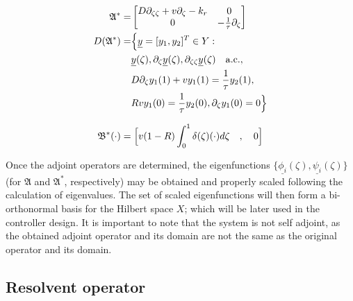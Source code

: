 \begin{equation} \label{eq:adjoint_A}
    \begin{aligned}
        {\mathfrak{A}}^{*} =&
        \begin{bmatrix}
            D \partial_{\zeta \zeta} + v \partial_\zeta - k_r & 0\\
            0 & -\frac{1}{\tau} \partial_\zeta
        \end{bmatrix}\\
        D(\mathfrak{A}^*) =& \Bigl\{ \underline{y} = [y_1, y_2]^T \in Y:\\
        &\underline{y}(\zeta), \partial_\zeta \underline{y}(\zeta), \partial_{\zeta \zeta} \underline{y}(\zeta) \quad \mathrm{a.c.},\\
        &D \partial_\zeta y_1(1) + v y_1(1) = \frac{1}{\tau} y_2(1), \\
        &R v y_1(0) = \frac{1}{\tau} y_2(0), 
        \partial_\zeta y_1(0) = 0 \Bigr\}
    \end{aligned}
\end{equation}

\begin{equation} \label{eq:adjoint_B}
    \mathfrak{B}^* (\cdot) = \Bigl[ v(1-R) \int_0^1 \delta(\zeta) (\cdot) d\zeta \quad , \quad 0 \Bigr]
\end{equation}

Once the adjoint operators are determined, the eigenfunctions $\{ \underline{\phi_i}(\zeta), \underline{\psi_i}(\zeta) \}$ (for $\mathfrak{A}$ and $\mathfrak{A}^*$, respectively) may be obtained and properly scaled following the calculation of eigenvalues. The set of scaled eigenfunctions will then form a bi-orthonormal basis for the Hilbert space $X$; which will be later used in the controller design. It is important to note that the system is not self adjoint, as the obtained adjoint operator and its domain are not the same as the original operator and its domain.

\subsection{Resolvent operator}

